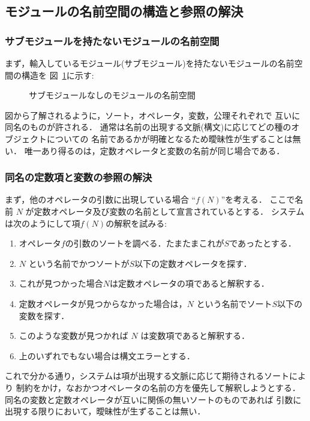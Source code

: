 \documentclass[a4paper,oneside,10pt]{memoir}
\begin{document}
\subsection{モジュールの名前空間の構造と参照の解決}
\label{sec:inner-module-namaspece}

\subsubsection{サブモジュールを持たないモジュールの名前空間}
\label{sec:flat-module}

まず，輸入しているモジュール(サブモジュール)を持たないモジュールの名前空間の構造を%
図~\ref{fig:flat-module-namespece}に示す:
\begin{figure}[H]
\begin{center}
  
\caption{サブモジュールなしのモジュールの名前空間}
\label{fig:flat-module-namespece}
\end{center}
\end{figure}
図から了解されるように，ソート，オペレータ，変数，公理それぞれで%
互いに同名のものが許される．
通常は名前の出現する文脈(構文)に応じてどの種のオブジェクトについての%
名前であるかが明確となるため曖昧性が生ずることは無い．
唯一あり得るのは，定数オペレータと変数の名前が同じ場合である．

\subsubsection{同名の定数項と変数の参照の解決}
まず，他のオペレータの引数に出現している場合 ``$f(N)$''を考える．
ここで名前 $N$ が定数オペレータ及び変数の名前として宣言されているとする．
システムは次のようにして項$f(N)$の解釈を試みる:
\begin{enumerate}
\item オペレータ$f$の引数のソートを調べる．たまたまこれが$S$であったとする．
\item $N$ という名前でかつソートが$S$以下の定数オペレータを探す．
\item これが見つかった場合$N$は定数オペレータの項であると解釈する．
\item 定数オペレータが見つからなかった場合は，$N$ という名前でソート$S$以下の変数を探す．
\item このような変数が見つかれば $N$ は変数項であると解釈する．
\item 上のいずれでもない場合は構文エラーとする．
\end{enumerate}
これで分かる通り，システムは項が出現する文脈に応じて期待されるソートにより%
制約をかけ，なおかつオペレータの名前の方を優先して解釈しようとする．
同名の変数と定数オペレータが互いに関係の無いソートのものであれば%
引数に出現する限りにおいて，曖昧性が生ずることは無い．
\end{document}
